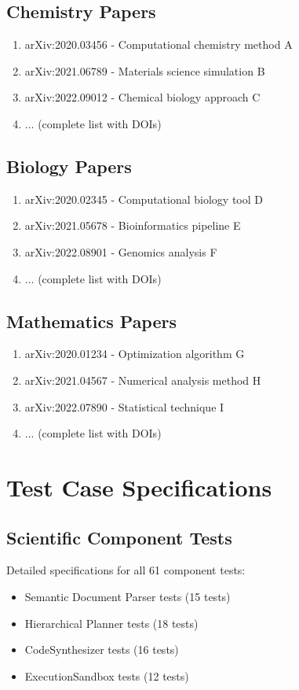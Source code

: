 \documentclass[10pt]{article}
\begin{document}
\subsection{Chemistry Papers}
\begin{enumerate}
    \item arXiv:2020.03456 - Computational chemistry method A
    \item arXiv:2021.06789 - Materials science simulation B
    \item arXiv:2022.09012 - Chemical biology approach C
    \item ... (complete list with DOIs)
\end{enumerate}

\subsection{Biology Papers}
\begin{enumerate}
    \item arXiv:2020.02345 - Computational biology tool D
    \item arXiv:2021.05678 - Bioinformatics pipeline E
    \item arXiv:2022.08901 - Genomics analysis F
    \item ... (complete list with DOIs)
\end{enumerate}

\subsection{Mathematics Papers}
\begin{enumerate}
    \item arXiv:2020.01234 - Optimization algorithm G
    \item arXiv:2021.04567 - Numerical analysis method H
    \item arXiv:2022.07890 - Statistical technique I
    \item ... (complete list with DOIs)
\end{enumerate}

\section{Test Case Specifications}

\subsection{Scientific Component Tests}
Detailed specifications for all 61 component tests:
\begin{itemize}
    \item Semantic Document Parser tests (15 tests)
    \item Hierarchical Planner tests (18 tests)
    \item CodeSynthesizer tests (16 tests)
    \item ExecutionSandbox tests (12 tests)
\end{itemize}
\end{document}
